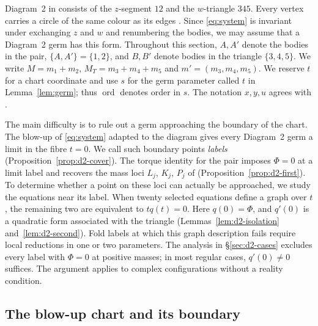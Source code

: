 \documentclass[11pt]{amsart}
\theoremstyle{definition}
\theoremstyle{remark}
\newcommand{\ord}{\operatorname{ord}}
\begin{document}
{Diagram~2 in \cite[Fig.~11]{AK} consists of the $z$-segment $12$ and the $w$-triangle $345$.
Every vertex carries a circle of the same colour as its edges \cite[\S8.2, p.~572]{AK}.
Since \eqref{eq:system} is invariant under exchanging $z$ and $w$ and renumbering the bodies,
we may assume that a Diagram~2 germ has this form.
Throughout this section, $A,A'$ denote the bodies in the pair, $\{A,A'\}=\{1,2\}$, and $B,B'$
denote bodies in the triangle $\{3,4,5\}$.  We write $M=m_1+m_2$, $M_T=m_3+m_4+m_5$ and
$m'=(m_3,m_4,m_5)$.  We reserve $t$ for a chart coordinate and use $s$ for the germ parameter
called $t$ in Lemma~\ref{lem:germ}; thus $\ord$ denotes order in $s$.
The notation $x,y,u$ agrees with \cite[\S8.2]{AK}.}

{The main difficulty is to rule out a germ approaching the boundary of the chart.
The blow-up of \eqref{eq:system} adapted to the diagram gives every Diagram~2 germ a limit
in the fibre $t=0$.  We call such boundary points \emph{labels}
(Proposition~\ref{prop:d2-cover}).  The torque identity for the pair imposes $\Phi=0$ at a
limit label and recovers the mass loci $L_j$, $K_j$, $P_j$ of \cite[\S8.2]{AK}
(Proposition~\ref{prop:d2-first}).  To determine whether a point on these loci can actually
be approached, we study the equations near its label.  When twenty selected equations
define a graph over $t$, the remaining two are equivalent to $tq(t)=0$.  Here $q(0)=\Phi$,
and $q'(0)$ is a quadratic form associated with the triangle
(Lemmas~\ref{lem:d2-isolation} and~\ref{lem:d2-second}).  Fold labels at which this graph
description fails require local reductions in one or two parameters.
The analysis in \S\ref{sec:d2-cases} excludes every label with $\Phi=0$ at positive masses;
in most regular cases, $q'(0)\ne0$ suffices.  The argument applies to complex configurations
without a reality condition.}

\subsection{\texorpdfstring{The blow-up chart and its boundary}{The blow-up chart and its boundary}}\label{sec:d2-chart}
\end{document}
